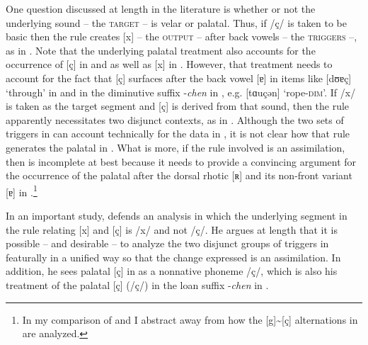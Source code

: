 One question discussed at length in the literature is whether or not the underlying sound -- the \textsc{target} -- is velar or palatal. Thus, if /ç/ is taken to be basic then the rule creates [x] -- the \textsc{output} -- after back vowels -- the \textsc{triggers} --, as in . Note that the underlying palatal treatment also accounts for the occurrence of [ç] in  and  as well as [x] in . However, that treatment needs to account for the fact that [ç] surfaces after the back vowel [ɐ] in items like [dʊɐç] ‘through’ in  and in the diminutive suffix -\textit{chen} in , e.g. [tɑuçən] ‘rope-\textsc{dim}’. If /x/ is taken as the target segment and [ç] is derived from that sound, then the rule apparently necessitates two disjunct contexts, as in . Although the two sets of triggers in  can account technically for the data in , it is not clear how that rule generates the palatal in . What is more, if the rule involved is an assimilation, then  is incomplete at best because it needs to provide a convincing argument for the occurrence of the palatal after the dorsal rhotic [ʀ] and its non-front variant [ɐ] in .\footnote{In my comparison of  and  I abstract away from how the [g]{\textasciitilde}[ç] alternations in  are analyzed.}

\ea\label{ex:1:4}
\ea\label{ex:1:4a}
\ex\label{ex:1:4b}
\z
\z

In an important study, \citet{Robinson2001} defends an analysis in which the underlying segment in the rule relating [x] and [ç] is /x/ and not /ç/. He argues at length that it is possible -- and desirable -- to analyze the two disjunct groups of triggers in  featurally in a unified way so that the change expressed is an assimilation. In addition, he sees palatal [ç] in  as a nonnative phoneme /ç/, which is also his treatment of the palatal [ç] (/ç/) in the loan suffix -\textit{chen} in .

